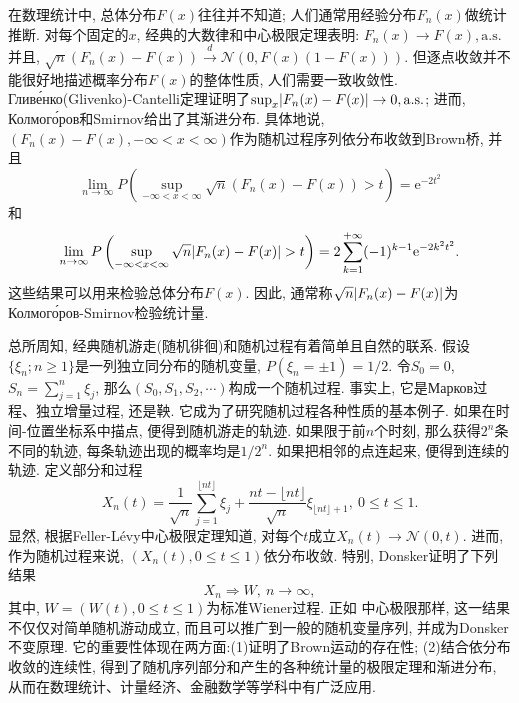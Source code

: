 在数理统计中, 总体分布$F(x)$往往并不知道; 人们通常用经验分布$F_n(x)$做统计推断. 对每个固定的$x$, 经典的大数律和中心极限定理表明: $F_n(x)\to F(x),\mathrm{a.s.}$并且, $\sqrt{n}(F_n(x)-F(x))\stackrel{d}{\rightarrow}\mathcal{N}(0,F(x)(1-F(x)))$. 但逐点收敛并不能很好地描述概率分布$F(x)$的整体性质, 人们需要一致收敛性. Гливе́нко(Glivenko)-Cantelli定理证明了$\sup_x\lvert F_n(x)-F(x)\rvert\to 0,\mathrm{a.s.}$; 进而, Колмого́ров和Smirnov给出了其渐进分布. 具体地说, $(F_n(x)-F(x),-\infty<x<\infty)$作为随机过程序列依分布收敛到Brown桥, 并且\begin{equation}
\lim_{n\to\infty}P\left( \sup_{-\infty<x<\infty}\sqrt{n}(F_n(x)-F(x))>t \right) = \mathrm{e}^{-2t^2}
\end{equation}
和\begin{equation}
\lim_{n\to\infty}P\left( \sup_{-\infty<x<\infty}\sqrt{n}\lvert F_n(x)-F(x)\rvert>t \right) = 2\sum_{k = 1}^{+\infty}(-1)^{k-1}\mathrm{e}^{-2k^2t^2}.
\end{equation}
这些结果可以用来检验总体分布$F(x)$. 因此, 通常称$\sqrt{n}\lvert F_n(x)-F(x)\rvert$为Колмого́ров-Smirnov检验统计量.

总所周知, 经典随机游走(随机徘徊)和随机过程有着简单且自然的联系. 假设$\{\xi_n;n\geqslant 1\}$是一列独立同分布的随机变量, $P(\xi_n=\pm 1) = 1/2$. 令$S_0 = 0$, $S_n = \sum_{j=1}^n\xi_j$, 那么$(S_0,S_1,S_2,\cdots)$构成一个随机过程. 事实上, 它是Марков过程、独立增量过程, 还是鞅. 它成为了研究随机过程各种性质的基本例子. 如果在时间-位置坐标系中描点, 便得到随机游走的轨迹. 如果限于前$n$个时刻, 那么获得$2^n$条不同的轨迹, 每条轨迹出现的概率均是$1/2^n$.  如果把相邻的点连起来, 便得到连续的轨迹. 定义部分和过程
\begin{equation}
X_n(t) = \frac{1}{\sqrt{n}}\sum_{j = 1}^{\lfloor nt\rfloor}\xi_j + \frac{nt-\lfloor nt\rfloor}{\sqrt{n}}\xi_{\lfloor nt\rfloor+1},~0\leqslant t\leqslant 1.
\end{equation}
显然, 根据Feller-Lévy中心极限定理知道, 对每个$t$成立$X_n(t)\to \mathcal{N}(0,t)$. 进而, 作为随机过程来说, $(X_n(t),0\leqslant t\leqslant 1)$依分布收敛. 特别, Donsker证明了下列结果
\begin{equation}
X_n\Rightarrow W,~n\to\infty,
\end{equation}
其中, $W = (W(t),0\leqslant t\leqslant 1)$为标准Wiener过程. 正如
中心极限那样, 这一结果不仅仅对简单随机游动成立, 而且可以推广到一般的随机变量序列, 并成为Donsker不变原理. 它的重要性体现在两方面:(1)证明了Brown运动的存在性; (2)结合依分布收敛的连续性, 得到了随机序列部分和产生的各种统计量的极限定理和渐进分布, 从而在数理统计、计量经济、金融数学等学科中有广泛应用.

